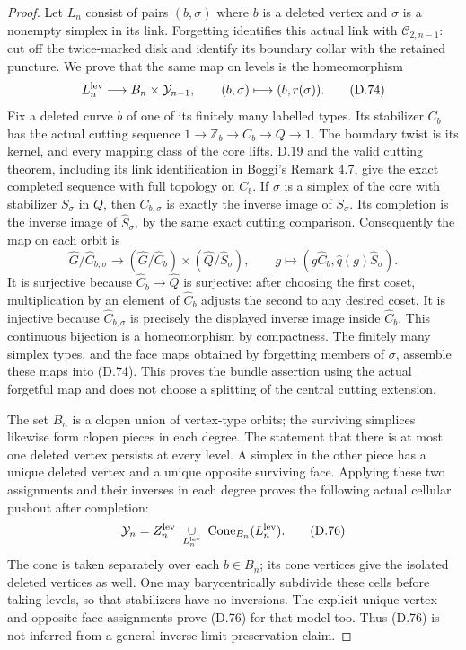 \begin{proof}
Let $L_n$ consist of pairs $(b,\sigma)$ where $b$ is a deleted
vertex and $\sigma$ is a nonempty simplex in its link.  Forgetting
identifies this actual link with $\mathcal C_{2,n-1}$: cut off
the twice-marked disk and identify its boundary collar with the
retained puncture.  We prove that the same map on levels is the
homeomorphism
\[
 L_n^{\rm lev}\longrightarrow B_n\times\mathcal Y_{n-1},
       \qquad (b,\sigma)\longmapsto(b,r(\sigma)).
                                                               \tag{D.74}
\]
Fix a deleted curve $b$ of one of its finitely many labelled
types.  Its stabilizer $C_b$ has the actual cutting sequence
$1\to\mathbb Z_b\to C_b\to Q\to1$.  The boundary twist is its
kernel, and every mapping class of the core lifts.  D.19 and
the valid cutting theorem, including its link identification
in Boggi's Remark 4.7, give the exact completed sequence with
full topology on $C_b$.  If $\sigma$ is a simplex of the core
with stabilizer $S_\sigma$ in $Q$, then $C_{b,\sigma}$ is exactly
the inverse image of $S_\sigma$.  Its completion is the inverse
image of $\widehat S_\sigma$, by the same exact cutting
comparison.  Consequently the map on each orbit is
\[
 \widehat G/\widehat C_{b,\sigma}
 \longrightarrow
   (\widehat G/\widehat C_b)\times
   (\widehat Q/\widehat S_\sigma),\qquad
 g\longmapsto(g\widehat C_b,\widehat q(g)\widehat S_\sigma).
                                                               \tag{D.75}
\]
It is surjective because $\widehat C_b\to\widehat Q$ is
surjective: after choosing the first coset, multiplication by
an element of $\widehat C_b$ adjusts the second to any desired
coset.  It is injective because
$\widehat C_{b,\sigma}$ is precisely the displayed inverse
image inside $\widehat C_b$.  This continuous bijection is a
homeomorphism by compactness.  The finitely many simplex
types, and the face maps obtained by forgetting members of
$\sigma$, assemble these maps into (D.74).  This proves the
bundle assertion using the actual forgetful map and does not
choose a splitting of the central cutting extension.

The set $B_n$ is a clopen union of vertex-type orbits; the
surviving simplices likewise form clopen pieces in each degree.
The statement that there is at most one deleted vertex persists
at every level.  A simplex in the other piece has a unique
deleted vertex and a unique opposite surviving face.  Applying
these two assignments and their inverses in each degree proves
the following actual cellular pushout after completion:
\[
 \mathcal Y_n =
 Z_n^{\rm lev}\ \underset{L_n^{\rm lev}}{\cup}\
             \operatorname{Cone}_{B_n}(L_n^{\rm lev}).
                                                               \tag{D.76}
\]
The cone is taken separately over each $b\in B_n$; its cone
vertices give the isolated deleted vertices as well.
One may barycentrically subdivide these cells before taking
levels, so that stabilizers have no inversions.  The explicit
unique-vertex and opposite-face assignments prove (D.76) for
that model too.  Thus (D.76) is not inferred from a general
inverse-limit preservation claim.


\end{proof}
